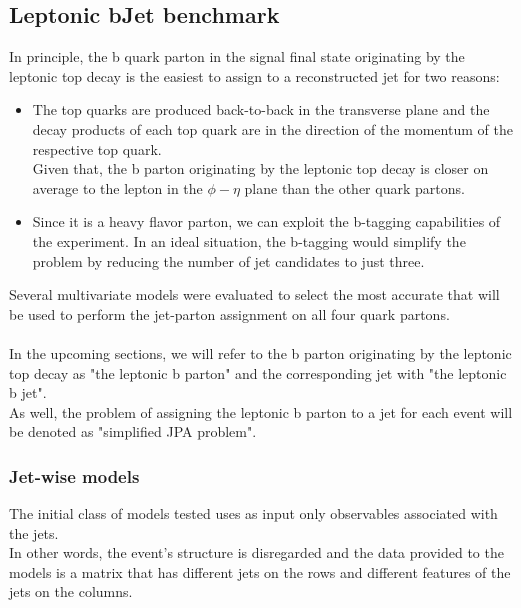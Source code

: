 \subsection{Leptonic bJet benchmark}
In principle, the b quark parton in the signal final state originating by the leptonic top decay is the easiest to assign to a reconstructed jet for two reasons:
\begin{itemize}
    \item The top quarks are produced back-to-back in the transverse plane and the decay products of each top quark are in the direction of the momentum of the respective top quark.\\
    Given that, the b parton originating by the leptonic top decay is closer on average to the lepton in the $\phi-\eta$ plane than the other quark partons.
    \item Since it is a heavy flavor parton, we can exploit the b-tagging capabilities of the experiment. In an ideal situation, the b-tagging would simplify the problem by reducing the number of jet candidates to just three.
\end{itemize}
Several multivariate models were evaluated to select the most accurate that will be used to perform the jet-parton assignment on all four quark partons.\\
\\
In the upcoming sections, we will refer to the b parton originating by the leptonic top decay as "the leptonic b parton" and the corresponding jet with "the leptonic b jet".\\
As well, the problem of assigning the leptonic b parton to a jet for each event will be denoted as "simplified JPA problem".
\subsubsection*{Jet-wise models}
The initial class of models tested uses as input only observables associated with the jets.\\
In other words, the event's structure is disregarded and the data provided to the models is a matrix that has different jets on the rows and different features of the jets on the columns.  

